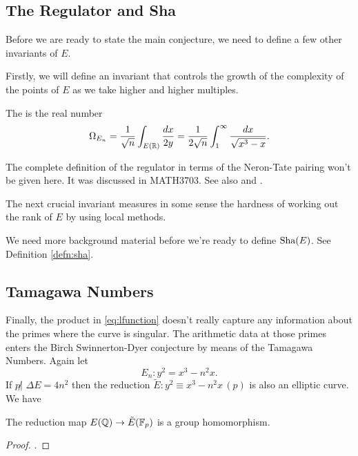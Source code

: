 \documentclass[12pt, a4paper]{amsart}
\begin{document}
\subsection{The Regulator and Sha}

Before we are ready to state the main conjecture, we need to define a few
other invariants of $E$. 

Firstly, we will define an invariant that controls the growth of the complexity
of the points of $E$ as we take higher and higher multiples.

\begin{defn}[Regulator] 
  The  is the real number
  \[ \Omega_{E_n} = \frac{1}{\sqrt{n}} \int_{E({\mathbb R})} \frac{dx}{2y} =
    \frac{1}{2 \sqrt{n}} \int_1^\infty \frac{dx}{\sqrt{x^3-x}}.\]
\end{defn}
\begin{remark}
  The complete definition of the regulator in terms of the Neron-Tate pairing
  won't be given here. It was discussed in MATH3703.
  See also
  \cite[Section 13-7, page 126]{Granville} and
  \cite[Section VIII.9, pages 252-253]{arithmetic}.
\end{remark}

The next crucial invariant measures in some sense the hardness of working
out the rank of $E$ by using local methods.

\begin{defn}
  We need more background material before we're ready to define $\text{Sha}(E)$.
  See Definition \autoref{defn:sha}.
\end{defn}

\subsection{Tamagawa Numbers}

Finally, the product in \autoref{eq:lfunction} doesn't really capture any information
about the primes where the curve is singular. The arithmetic data at those
primes enters the Birch Swinnerton-Dyer conjecture by means of the Tamagawa
Numbers.
Again let
$$ E_n : y^2 = x^3 - n^2 x. $$
If $p \not| \,\, \Delta E = 4n^2$ then the reduction $\tilde{E} : y^2 \equiv x^3 - n^2 x \,
(p)$ is
also an elliptic curve. We have

\begin{prop}
  The reduction map $E({\mathbb Q}) \rightarrow \tilde{E}(\mathbb{F}_p)$ is a group homomorphism.
\end{prop}
\begin{proof}
  \cite[See][Chapter IV, pages 121-123]{rational}.
\end{proof}
\end{document}
